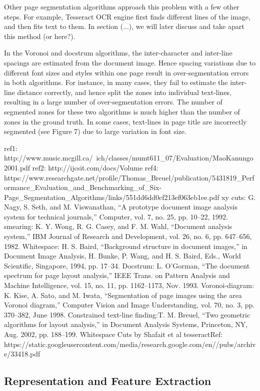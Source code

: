 Other page segmentation algorithms approach this problem with a few other steps. For example, Tesseract OCR engine first finds different lines of the image, and then fits text to them. In section (...), we will later discuss and take apart this method (or here?).


In the Voronoi and docstrum algorithms, the inter-character and inter-line spacings are
estimated from the document image. Hence spacing variations due to different font sizes and
styles within one page result in over-segmentation errors in both algorithms. For instance,
in many cases, they fail to estimate the inter-line distance correctly, and hence split the
zones into individual text-lines, resulting in a large number of over-segmentation errors.
The number of segmented zones for these two algorithms is much higher than the number
of zones in the ground truth. In some cases, text-lines in page title are incorrectly segmented
(see Figure 7) due to large variation in font size.

ref1: http://www.music.mcgill.ca/~ich/classes/mumt611_07/Evaluation/MaoKanungo2001.pdf
ref2: http://ijcsit.com/docs/Volume%
ref4: https://www.researchgate.net/profile/Thomas_Breuel/publication/5431819_Performance_Evaluation_and_Benchmarking_of_Six-Page_Segmentation_Algorithms/links/551dd6dd0cf213ef063eb1ee.pdf
xy cuts: G. Nagy, S. Seth, and M. Viswanathan, “A prototype document
image analysis system for technical journals,” Computer, vol. 7,
no. 25, pp. 10–22, 1992.
smearing: K. Y. Wong, R. G. Casey, and F. M. Wahl, “Document analysis
system,” IBM Journal of Research and Development, vol. 26,
no. 6, pp. 647–656, 1982.
Whitespace: H. S. Baird, “Background structure in document images,” in
Document Image Analysis, H. Bunke, P. Wang, and H. S. Baird,
Eds., World Scientific, Singapore, 1994, pp. 17–34.
Docstrum: L. O’Gorman, “The document spectrum for page layout analysis,”
IEEE Trans. on Pattern Analysis and Machine Intelligence, vol. 15,
no. 11, pp. 1162–1173, Nov. 1993.
Voronoi-diagram: K. Kise, A. Sato, and M. Iwata, “Segmentation of page images
using the area Voronoi diagram,” Computer Vision and Image
Understanding, vol. 70, no. 3, pp. 370–382, June 1998.
Constrained text-line finding:T. M. Breuel, “Two geometric algorithms for layout analysis,” in
Document Analysis Systems, Princeton, NY, Aug. 2002, pp.
188–199.
Whitespace Cuts by Shafait et al
tesseractRef: https://static.googleusercontent.com/media/research.google.com/en//pubs/archive/33418.pdf

\subsection{Representation and Feature Extraction}

